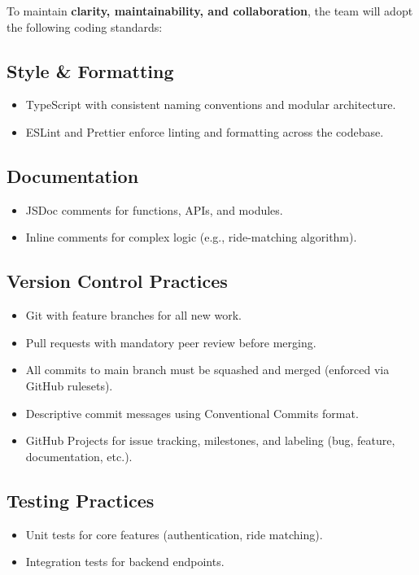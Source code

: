 \documentclass{article}
\begin{document}
To maintain \textbf{clarity, maintainability, and collaboration}, the team will adopt the following coding standards:

\subsection*{Style \& Formatting}
\begin{itemize}
    \item TypeScript with consistent naming conventions and modular architecture.
    \item ESLint and Prettier enforce linting and formatting across the codebase.
\end{itemize}

\subsection*{Documentation}
\begin{itemize}
    \item JSDoc comments for functions, APIs, and modules.
    \item Inline comments for complex logic (e.g., ride-matching algorithm).
\end{itemize}

\subsection*{Version Control Practices}
\begin{itemize}
    \item Git with feature branches for all new work.
    \item Pull requests with mandatory peer review before merging.
    \item All commits to main branch must be squashed and merged (enforced via GitHub rulesets).
    \item Descriptive commit messages using Conventional Commits format.
    \item GitHub Projects for issue tracking, milestones, and labeling (bug, feature, documentation, etc.).
\end{itemize}

\subsection*{Testing Practices}
\begin{itemize}
    \item Unit tests for core features (authentication, ride matching).
    \item Integration tests for backend endpoints.
\end{itemize}
\end{document}
